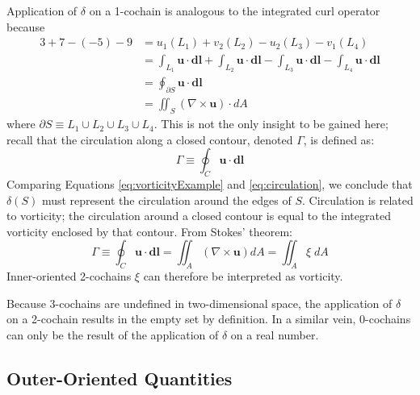 Application of $\delta$ on a 1-cochain is analogous to the integrated curl operator because\begin{equation}
    \begin{split}
        3 + 7 - (-5) - 9 &= u_1(L_1) + v_2(L_2) - u_2(L_3) - v_1(L_4) \\
        &= \int_{L_1} \mathbf{u} \cdot \mathbf{dl} + \int_{L_2} \mathbf{u} \cdot \mathbf{dl} - \int_{L_3} \mathbf{u} \cdot \mathbf{dl} - \int_{L_4} \mathbf{u} \cdot \mathbf{dl} \\
        &= \oint_{\partial S} \mathbf{u} \cdot \mathbf{dl} \\
        &= \iint_{S} \left( \nabla \times \mathbf{u} \right) \cdot dA
    \end{split}
    \label{eq:vorticityExample}
\end{equation}
where $\partial S \equiv L_1 \cup L_2 \cup L_3 \cup L_4$. This is not the only insight to be gained here; recall that the circulation along a closed contour, denoted $\Gamma$, is defined as:
\begin{equation}
    \Gamma \equiv \oint_C \mathbf{u} \cdot \mathbf{dl}
    \label{eq:circulation}
\end{equation}
Comparing Equations \eqref{eq:vorticityExample} and \eqref{eq:circulation}, we conclude that $\delta(S)$ must represent the circulation around the edges of $S$. Circulation is related to vorticity; the circulation around a closed contour is equal to the integrated vorticity enclosed by that contour. From Stokes' theorem:
\begin{equation}
    \Gamma \equiv \oint_C \mathbf{u} \cdot \mathbf{dl} = \iint_A \left( \nabla \times \mathbf{u} \right) dA = \iint_A \xi \; dA
\end{equation}
Inner-oriented 2-cochains $\xi$ can therefore be interpreted as vorticity.

Because $3$-cochains are undefined in two-dimensional space, the application of $\delta$ on a 2-cochain results in the empty set by definition. In a similar vein, 0-cochains can only be the result of the application of $\delta$ on a real number.

\subsection{Outer-Oriented Quantities}


